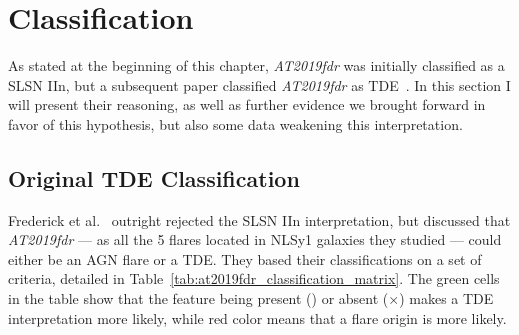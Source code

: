 \section{Classification}
As stated at the beginning of this chapter, \emph{AT2019fdr} was initially classified as a SLSN IIn, but a subsequent paper classified \emph{AT2019fdr} as TDE~\cite{Frederick2021}. In this section I will present their reasoning, as well as further evidence we brought forward in favor of this hypothesis, but also some data weakening this interpretation.

\subsection{Original TDE Classification}
Frederick et al.~\cite{Frederick2021} outright rejected the SLSN IIn interpretation, but discussed that \emph{AT2019fdr} --- as all the 5 flares located in NLSy1 galaxies they studied --- could either be an AGN flare or a TDE. They based their classifications on a set of criteria, detailed in Table~\ref{tab:at2019fdr_classification_matrix}. The green cells in the table show that the feature being present (\checkmark) or absent ($\times$) makes a TDE interpretation more likely, while red color means that a flare origin is more likely.

